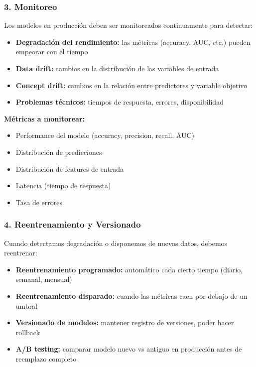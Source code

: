 \documentclass[11pt,a4paper]{article}
\begin{document}
\subsubsection{3. Monitoreo}

Los modelos en producción deben ser monitoreados continuamente para detectar:

\begin{itemize}
\item \textbf{Degradación del rendimiento:} las métricas (accuracy, AUC, etc.) pueden empeorar con el tiempo
\item \textbf{Data drift:} cambios en la distribución de las variables de entrada
\item \textbf{Concept drift:} cambios en la relación entre predictores y variable objetivo
\item \textbf{Problemas técnicos:} tiempos de respuesta, errores, disponibilidad
\end{itemize}

\textbf{Métricas a monitorear:}
\begin{itemize}
\item Performance del modelo (accuracy, precision, recall, AUC)
\item Distribución de predicciones
\item Distribución de features de entrada
\item Latencia (tiempo de respuesta)
\item Tasa de errores
\end{itemize}

\subsubsection{4. Reentrenamiento y Versionado}

Cuando detectamos degradación o disponemos de nuevos datos, debemos reentrenar:

\begin{itemize}
\item \textbf{Reentrenamiento programado:} automático cada cierto tiempo (diario, semanal, mensual)
\item \textbf{Reentrenamiento disparado:} cuando las métricas caen por debajo de un umbral
\item \textbf{Versionado de modelos:} mantener registro de versiones, poder hacer rollback
\item \textbf{A/B testing:} comparar modelo nuevo vs antiguo en producción antes de reemplazo completo
\end{itemize}
\end{document}
